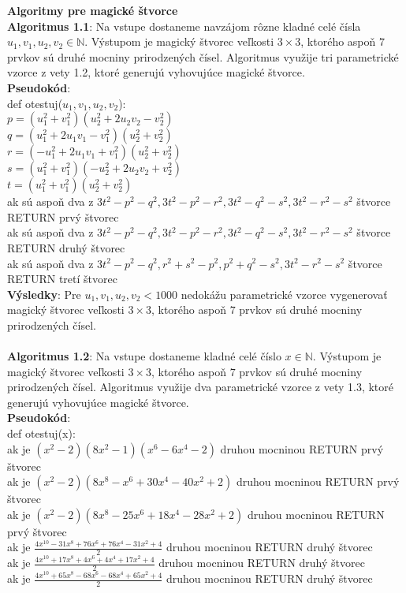 \documentclass[12pt]{article}
\begin{document}
\textbf{Algoritmy pre magické štvorce} \\

\textbf{Algoritmus 1.1}: Na vstupe dostaneme navzájom rôzne kladné celé čísla $u_1, v_1, u_2, v_2 \in \mathbb{N}$. Výstupom je magický štvorec veľkosti $3 \times 3$, ktorého aspoň $7$ prvkov sú druhé mocniny prirodzených čísel. Algoritmus využije tri parametrické vzorce z vety 1.2, ktoré generujú vyhovujúce magické štvorce. \\

\textbf{Pseudokód}: \\
def otestuj($u_1, v_1, u_2, v_2$): \\
$p = (u_1^2 + v_1^2)(u_2^2 + 2u_2 v_2 - v_2^2)$ \\
$q = (u_1^2 + 2u_1 v_1 - v_1^2)(u_2^2 + v_2^2)$ \\
$r = (- u_1^2 + 2u_1 v_1 + v_1^2)(u_2^2 + v_2^2)$ \\
$s = (u_1^2 + v_1^2)(-u_2^2 + 2u_2 v_2 + v_2^2)$ \\
$t = (u_1^2 + v_1^2)(u_2^2 + v_2^2)$ \\
ak sú aspoň dva z $3t^2 - p^2 - q^2, 3t^2 - p^2 - r^2, 3t^2 - q^2 - s^2, 3t^2 - r^2 - s^2$ štvorce RETURN prvý štvorec \\
ak sú aspoň dva z $3t^2 - p^2 - q^2, 3t^2 - p^2 - r^2, 3t^2 - q^2 - s^2, 3t^2 - r^2 - s^2$ štvorce RETURN druhý štvorec \\
ak sú aspoň dva z $3t^2 - p^2 - q^2, r^2 + s^2 - p^2, p^2 + q^2 - s^2, 3t^2 - r^2 - s^2$ štvorce RETURN tretí štvorec \\

\textbf{Výsledky}: Pre $u_1, v_1, u_2, v_2 < 1000$ nedokážu parametrické vzorce vygenerovať magický štvorec veľkosti $3 \times 3$, ktorého aspoň $7$ prvkov sú druhé mocniny prirodzených čísel. \\\\

\textbf{Algoritmus 1.2}: Na vstupe dostaneme kladné celé číslo $x \in \mathbb{N}$. Výstupom je magický štvorec veľkosti $3 \times 3$, ktorého aspoň $7$ prvkov sú druhé mocniny prirodzených čísel. Algoritmus využije dva parametrické vzorce z vety 1.3, ktoré generujú vyhovujúce magické štvorce. \\

\textbf{Pseudokód}: \\
def otestuj(x): \\
ak je $(x^2 - 2)(8x^2 - 1)(x^6 - 6x^4 - 2)$ druhou mocninou RETURN prvý štvorec \\
ak je $(x^2 - 2)(8x^8 - x^6 + 30x^4 - 40x^2 + 2)$ druhou mocninou RETURN prvý štvorec \\
ak je $(x^2 - 2)(8x^8 - 25x^6 + 18x^4 - 28x^2 + 2)$ druhou mocninou RETURN prvý štvorec \\
ak je $\frac{4x^{10} - 31x^8 + 76x^6 + 76x^4 - 31x^2 + 4}{2}$ druhou mocninou RETURN druhý štvorec \\
ak je $\frac{4x^{10} + 17x^8 + 4x^6 + 4x^4 + 17x^2 + 4}{2}$ druhou mocninou RETURN druhý štvorec \\
ak je $\frac{4x^{10} + 65x^8 - 68x^6 - 68x^4 + 65x^2 + 4}{2}$ druhou mocninou RETURN druhý štvorec \\
\end{document}
